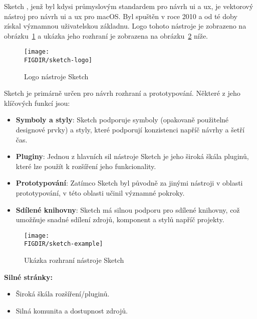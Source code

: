 \begin{subsection}{Sketch}
    \label{subsec:navrh-ui-nastroje-sketch}
    , jenž byl kdysi průmyslovým standardem pro návrh \ac{ui} a \ac{ux}, je vektorový nástroj pro návrh \ac{ui} a \ac{ux} pro macOS\@.
    Byl spuštěn v roce 2010 a od té doby získal významnou uživatelskou základnu\cite{w_industry_the_ultimate_battle_figma_vs_sketch_vs_adobe_xd}.
    Logo tohoto nástroje je zobrazeno na obrázku~\ref{fig:sketch-logo} a ukázka jeho rozhraní je zobrazena na obrázku~\ref{fig:sketch-example} níže.

    \begin{figure}[H]
        \centering
        \texttt{[image: \\FIGDIR/sketch-logo]}
        \caption{Logo nástroje Sketch\cite{sketch}}
        \label{fig:sketch-logo}
    \end{figure}

    Sketch je primárně určen pro návrh rozhraní a prototypování.
    Některé z jeho klíčových funkcí jsou:

    \begin{itemize}
        \item \textbf{Symboly a styly}: Sketch podporuje symboly (opakovaně použitelné designové prvky) a styly, které podporují konzistenci napříč návrhy a šetří čas.
        \item \textbf{Pluginy}: Jednou z hlavních sil nástroje Sketch je jeho široká škála pluginů, které lze použít k rozšíření jeho funkcionality.
        \item \textbf{Prototypování}: Zatímco Sketch byl původně za jinými nástroji v oblasti prototypování, v této oblasti učinil významné pokroky.
        \item \textbf{Sdílené knihovny}: Sketch má silnou podporu pro sdílené knihovny, což umožňuje snadné sdílení zdrojů, komponent a stylů napříč projekty.
    \end{itemize}

    \begin{figure}[H]
        \centering
        \texttt{[image: \\FIGDIR/sketch-example]}
        \caption{Ukázka rozhraní nástroje Sketch\cite{sketch}}
        \label{fig:sketch-example}
    \end{figure}

    \textbf{Silné stránky:}
    \begin{itemize}
        \item Široká škála rozšíření/pluginů.
        \item Silná komunita a dostupnost zdrojů.
    \end{itemize}


\end{subsection}
